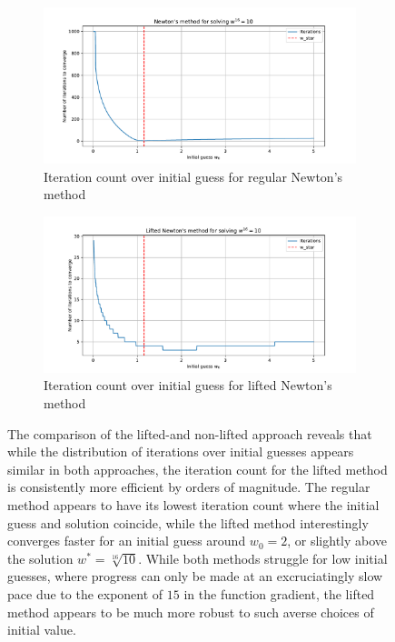 \documentclass[oneside, a4paper]{book}
\begin{document}
\begin{figure}[H]
  \begin{subfigure}{\textwidth}
    \centering
    \includegraphics[width=\linewidth]{non-lifted.pdf}
    \caption{Iteration count over initial guess for regular Newton's method}
    \label{fig:linreg}
  \end{subfigure}

  \begin{subfigure}{\textwidth}
    \centering
    \includegraphics[width=\linewidth]{lifted.pdf}
    \caption{Iteration count over initial guess for lifted Newton's method}
    \label{fig:linregout}
  \end{subfigure}
  \caption{The comparison of the lifted-and non-lifted approach reveals that while the distribution of iterations over initial guesses appears similar in both approaches, the iteration count for the lifted method is consistently more efficient by orders of magnitude. The regular method appears to have its lowest iteration count where the initial guess and solution coincide, while the lifted method interestingly converges faster for an initial guess around $w_0=2$, or slightly above the solution $w^*=\sqrt[16]{10}$. While both methods struggle for low initial guesses, where progress can only be made at an excruciatingly slow pace due to the exponent of $15$ in the function gradient, the lifted method appears to be much more robust to such averse choices of initial value.}
\end{figure}
\end{document}
